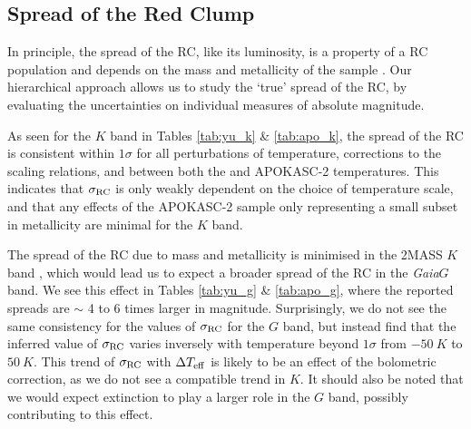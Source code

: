 \documentclass[fleqn,usenatbib]{mnras}
\newcommand{\sigrc}{\mbox{$\sigma_{\rm RC}$}\xspace}
\newcommand{\teff}{\mbox{$T_{\rm eff}$}\xspace}
\newcommand{\gaia}{\emph{Gaia}\xspace}
\newcommand{\new}[1]{#1}
\newcommand{\up}[1]{#1}
\begin{document}
\subsection{Spread of the Red Clump}\label{ssec:spread}

In principle, the spread of the RC, like its luminosity, is a property of a RC population and depends on the mass and metallicity of the sample \citep{art:girardi2016,art:salaris+girardi2002}. Our hierarchical approach allows us to study the `true' spread of the RC, by evaluating the uncertainties on individual measures of absolute magnitude.

As seen for the $K$ band in Tables \ref{tab:yu_k} \& \ref{tab:apo_k}, the spread of the RC is consistent within $1\sigma$ for all perturbations of temperature, corrections to the scaling relations, and between both the \cite{art:yu+2018} and APOKASC-2 temperatures. This indicates that \sigrc is only weakly dependent on the choice of temperature scale, and that any effects of the APOKASC-2 sample only representing a small subset in metallicity are minimal for the $K$ band.



The spread of the RC due to mass and metallicity is minimised in the 2MASS $K$ band \citep{art:salaris+girardi2002}, which would lead us to expect a broader spread of the RC in the \gaia $G$ band. We see this effect in Tables \ref{tab:yu_g} \& \ref{tab:apo_g}, where the reported spreads are $\sim$ 4 to 6 times larger in magnitude. Surprisingly, we do not see the same consistency for the values of \sigrc for the $G$ band, but instead find that the inferred value of \sigrc varies inversely with temperature beyond $1\sigma$ \new{from $-50\ K$ to $50\ K$}. This trend of \sigrc with $\Delta\teff$ is likely to be an effect of the bolometric correction, as we do not see a compatible trend in $K$. \up{It should also be noted that we would expect extinction to play a larger role in the $G$ band, possibly contributing to this effect.}
\end{document}
